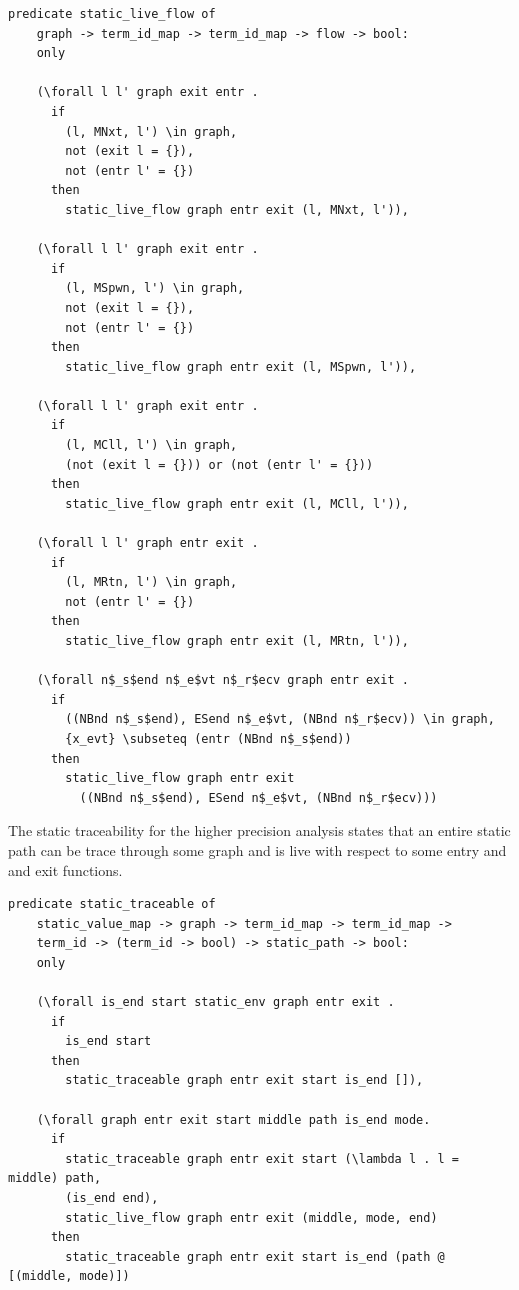 \documentclass[10pt]{article}
\begin{document}
\begin{lstlisting}[language=logic, mathescape]
  predicate static_live_flow of
    graph -> term_id_map -> term_id_map -> flow -> bool:
    only

    (\forall l l' graph exit entr . 
      if
        (l, MNxt, l') \in graph,
        not (exit l = {}),
        not (entr l' = {})
      then
        static_live_flow graph entr exit (l, MNxt, l')),

    (\forall l l' graph exit entr .
      if
        (l, MSpwn, l') \in graph, 
        not (exit l = {}),
        not (entr l' = {})
      then
        static_live_flow graph entr exit (l, MSpwn, l')),

    (\forall l l' graph exit entr .
      if
        (l, MCll, l') \in graph,
        (not (exit l = {})) or (not (entr l' = {}))
      then
        static_live_flow graph entr exit (l, MCll, l')),

    (\forall l l' graph entr exit .
      if
        (l, MRtn, l') \in graph,
        not (entr l' = {})
      then
        static_live_flow graph entr exit (l, MRtn, l')),

    (\forall n$_s$end n$_e$vt n$_r$ecv graph entr exit .
      if
        ((NBnd n$_s$end), ESend n$_e$vt, (NBnd n$_r$ecv)) \in graph, 
        {x_evt} \subseteq (entr (NBnd n$_s$end))
      then
        static_live_flow graph entr exit
          ((NBnd n$_s$end), ESend n$_e$vt, (NBnd n$_r$ecv)))
  \end{lstlisting}

The static traceability for the higher precision analysis states
that an entire static path can be trace through some graph and
is live with respect to some entry and and exit functions.

\begin{lstlisting}[language=logic, mathescape]
  predicate static_traceable of
    static_value_map -> graph -> term_id_map -> term_id_map ->
    term_id -> (term_id -> bool) -> static_path -> bool:
    only

    (\forall is_end start static_env graph entr exit .
      if
        is_end start
      then
        static_traceable graph entr exit start is_end []),

    (\forall graph entr exit start middle path is_end mode. 
      if
        static_traceable graph entr exit start (\lambda l . l = middle) path, 
        (is_end end),
        static_live_flow graph entr exit (middle, mode, end) 
      then
        static_traceable graph entr exit start is_end (path @ [(middle, mode)])
  \end{lstlisting}
\end{document}
